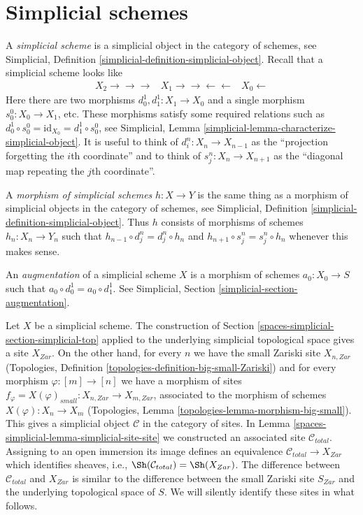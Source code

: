 \section{Simplicial schemes}
\label{spaces-simplicial-section-simplicial}
A {\it simplicial scheme} is a simplicial object in the category of schemes,
see Simplicial, Definition \ref{simplicial-definition-simplicial-object}.
Recall that a simplicial scheme looks like
$$
\begin{array}{ccc}X_2
\longrightarrow\longrightarrow\longrightarrow & X_1
\longrightarrow\longrightarrow\longleftarrow\longleftarrow & X_0
\longleftarrow\end{array}
$$
Here there are two morphisms $d^1_0, d^1_1 : X_1 \to X_0$
and a single morphism $s^0_0 : X_0 \to X_1$, etc.
These morphisms satisfy some required relations such as
$d^1_0 \circ s^0_0 = \text{id}_{X_0} = d^1_1 \circ s^0_0$, see
Simplicial, Lemma \ref{simplicial-lemma-characterize-simplicial-object}.
It is useful to think of $d^n_i : X_n \to X_{n - 1}$
as the ``projection forgetting the $i$th coordinate'' and
to think of $s^n_j : X_n \to X_{n + 1}$ as the ``diagonal map repeating
the $j$th coordinate''.

\medskip\noindent
A {\it morphism of simplicial schemes} $h : X \to Y$ is the same
thing as a morphism of simplicial objects in the category of schemes,
see Simplicial, Definition \ref{simplicial-definition-simplicial-object}.
Thus $h$ consists of morphisms of schemes $h_n : X_n \to Y_n$
such that $h_{n - 1} \circ d^n_j = d^n_j \circ h_n$ and
$h_{n + 1} \circ s^n_j = s^n_j \circ h_n$ whenever this makes sense.

\medskip\noindent
An {\it augmentation} of a simplicial scheme $X$ is a morphism
of schemes $a_0 : X_0 \to S$ such that $a_0 \circ d^1_0 = a_0 \circ d^1_1$.
See Simplicial, Section \ref{simplicial-section-augmentation}.

\medskip\noindent
Let $X$ be a simplicial scheme. The construction of
Section \ref{spaces-simplicial-section-simplicial-top} applied to the underlying
simplicial topological space gives a site $X_{Zar}$.
On the other hand, for every $n$ we have the small Zariski site
$X_{n, Zar}$ (Topologies, Definition
\ref{topologies-definition-big-small-Zariski})
and for every morphism $\varphi : [m] \to [n]$
we have a morphism of sites
$f_\varphi = X(\varphi)_{small} : X_{n, Zar} \to X_{m, Zar}$,
associated to the morphism of schemes
$X(\varphi) : X_n \to X_m$ (Topologies, Lemma
\ref{topologies-lemma-morphism-big-small}).
This gives a simplicial object $\mathcal{C}$ in the category of sites.
In Lemma \ref{spaces-simplicial-lemma-simplicial-site-site} we constructed an associated
site $\mathcal{C}_{total}$. Assigning to an open immersion its image
defines an equivalence $\mathcal{C}_{total} \to X_{Zar}$ which
identifies sheaves, i.e., $\Sh(\mathcal{C}_{total}) = \Sh(X_{Zar})$.
The difference between $\mathcal{C}_{total}$ and $X_{Zar}$
is similar to the difference between the small Zariski site $S_{Zar}$
and the underlying topological space of $S$.
We will silently identify these sites in what follows.

